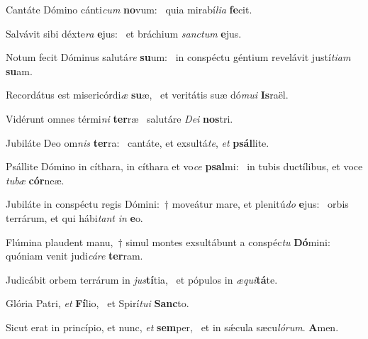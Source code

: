 \item Cantáte Dómino cánti\textit{cum} \textbf{no}vum:~\psstar{} quia mirabí\textit{lia} \textbf{fe}cit.
\item Salvávit sibi déxte\textit{ra} \textbf{e}jus:~\psstar{} et bráchium \textit{sanctum} \textbf{e}jus.
\item Notum fecit Dóminus salutá\textit{re} \textbf{su}um:~\psstar{} in conspéctu géntium revelávit justí\textit{tiam} \textbf{su}am.
\item Recordátus est misericórdi\textit{æ} \textbf{su}æ,~\psstar{} et veritátis suæ dó\textit{mui} \textbf{Is}raël.
\item Vidérunt omnes térmi\textit{ni} \textbf{ter}ræ~\psstar{} salutáre \textit{Dei} \textbf{nos}tri.
\item Jubiláte Deo om\textit{nis} \textbf{ter}ra:~\psstar{} cantáte, et exsultá\textit{te}, \textit{et} \textbf{psál}lite.
\item Psállite Dómino in cíthara, in cíthara et vo\textit{ce} \textbf{psal}mi:~\psstar{} in tubis ductílibus, et voce \textit{tubæ} \textbf{cór}neæ.
\item Jubiláte in conspéctu regis Dómini:~† moveátur mare, et plenitú\textit{do} \textbf{e}jus:~\psstar{} orbis terrárum, et qui hábi\textit{tant} \textit{in} \textbf{e}o.
\item Flúmina plaudent manu,~† simul montes exsultábunt a conspéc\textit{tu} \textbf{Dó}mini:~\psstar{} quóniam venit judi\textit{cáre} \textbf{ter}ram.
\item Judicábit orbem terrárum in \textit{jus}\textbf{tí}tia,~\psstar{} et pópulos in \textit{æqui}\textbf{tá}te.
\item Glória Patri, \textit{et} \textbf{Fí}lio,~\psstar{} et Spirí\textit{tui} \textbf{Sanc}to.
\item Sicut erat in princípio, et nunc, \textit{et} \textbf{sem}per,~\psstar{} et in sǽcula sæcu\textit{lórum}. \textbf{A}men.